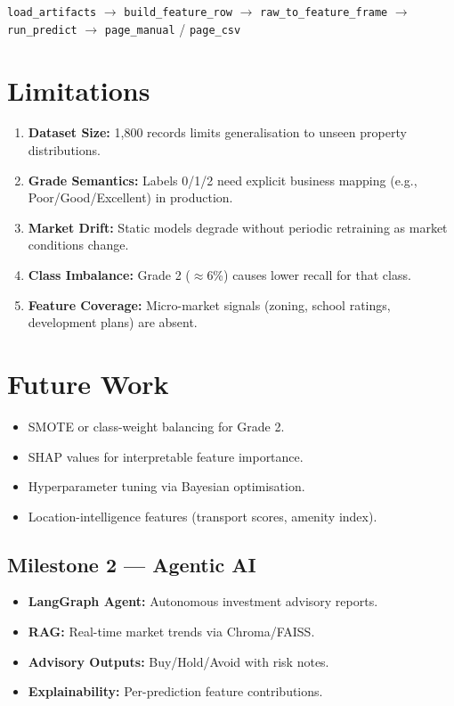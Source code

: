 \documentclass[12pt,a4paper]{article}
\begin{document}
\texttt{load\_artifacts} $\to$ \texttt{build\_feature\_row} $\to$
\texttt{raw\_to\_feature\_frame} $\to$ \texttt{run\_predict} $\to$
\texttt{page\_manual} / \texttt{page\_csv}

\section{Limitations}

\begin{enumerate}
    \item \textbf{Dataset Size:} 1,800 records limits generalisation to
          unseen property distributions.
    \item \textbf{Grade Semantics:} Labels 0/1/2 need explicit business
          mapping (e.g., Poor/Good/Excellent) in production.
    \item \textbf{Market Drift:} Static models degrade without periodic
          retraining as market conditions change.
    \item \textbf{Class Imbalance:} Grade 2 ($\approx$6\%) causes lower
          recall for that class.
    \item \textbf{Feature Coverage:} Micro-market signals (zoning, school
          ratings, development plans) are absent.
\end{enumerate}

\section{Future Work}

\begin{itemize}[noitemsep]
    \item SMOTE or class-weight balancing for Grade 2.
    \item SHAP values for interpretable feature importance.
    \item Hyperparameter tuning via Bayesian optimisation.
    \item Location-intelligence features (transport scores, amenity index).
\end{itemize}

\subsection{Milestone 2 --- Agentic AI}

\begin{itemize}[noitemsep]
    \item \textbf{LangGraph Agent:} Autonomous investment advisory reports.
    \item \textbf{RAG:} Real-time market trends via Chroma/FAISS.
    \item \textbf{Advisory Outputs:} Buy/Hold/Avoid with risk notes.
    \item \textbf{Explainability:} Per-prediction feature contributions.
\end{itemize}
\end{document}
